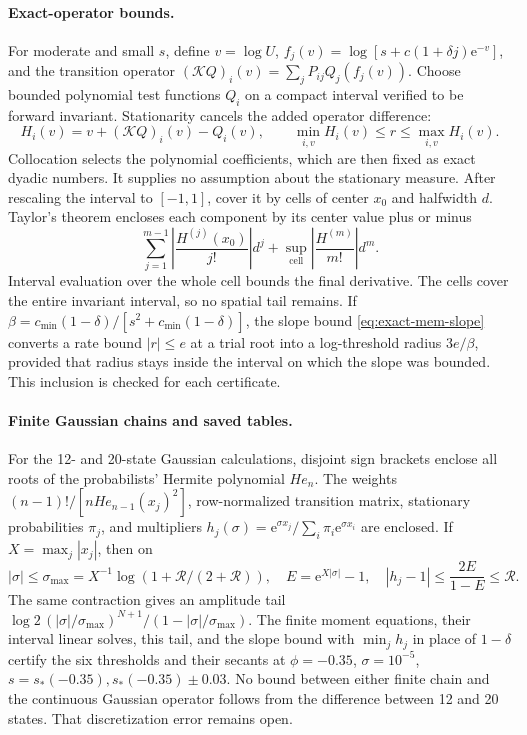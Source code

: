 \paragraph{Exact-operator bounds.}
For moderate and small \(s\), define \(v=\log U\),
\(f_j(v)=\log[s+c(1+\delta j)\mathrm e^{-v}]\), and the transition operator
\((\mathcal K Q)_i(v)=\sum_jP_{ij}Q_j(f_j(v))\).
Choose bounded polynomial test functions \(Q_i\) on a compact interval verified to be forward invariant. Stationarity cancels the added operator difference:
\begin{equation}\label{eq:exact-cert-residual}
 H_i(v)=v+(\mathcal K Q)_i(v)-Q_i(v),\qquad
 \min_{i,v}H_i(v)\leq r\leq\max_{i,v}H_i(v).
\end{equation}
Collocation selects the polynomial coefficients, which are then fixed as exact dyadic numbers. It supplies no assumption about the stationary measure. After rescaling the interval to \([-1,1]\), cover it by cells of center \(x_0\) and halfwidth \(d\). Taylor's theorem encloses each component by its center value plus or minus
\begin{equation}\label{eq:exact-cert-cell}
 \sum_{j=1}^{m-1}\left|\frac{H^{(j)}(x_0)}{j!}\right|d^j
 +\sup_{\mathrm{cell}}\left|\frac{H^{(m)}}{m!}\right|d^m.
\end{equation}
Interval evaluation over the whole cell bounds the final derivative. The cells cover the entire invariant interval, so no spatial tail remains. If \(\beta=c_{\min}(1-\delta)/[s^2+c_{\min}(1-\delta)]\), the slope bound \eqref{eq:exact-mem-slope} converts a rate bound \(|r|\leq e\) at a trial root into a log-threshold radius \(3e/\beta\), provided that radius stays inside the interval on which the slope was bounded. This inclusion is checked for each certificate.

\paragraph{Finite Gaussian chains and saved tables.}
For the 12- and 20-state Gaussian calculations, disjoint sign brackets enclose all roots of the probabilists' Hermite polynomial \(He_n\). The weights \((n-1)!/[nHe_{n-1}(x_j)^2]\), row-normalized transition matrix, stationary probabilities \(\pi_j\), and multipliers \(h_j(\sigma)=\mathrm e^{\sigma x_j}/\sum_i\pi_i\mathrm e^{\sigma x_i}\) are enclosed. If \(X=\max_j|x_j|\), then on
\begin{equation}\label{eq:exact-cert-gaussian}
 |\sigma|\leq\sigma_{\max}=X^{-1}\log(1+\mathcal R/(2+\mathcal R)),
 \quad E=\mathrm e^{X|\sigma|}-1,\quad
 |h_j-1|\leq\frac{2E}{1-E}\leq\mathcal R.
\end{equation}
The same contraction gives an amplitude tail
\(\log2\,(|\sigma|/\sigma_{\max})^{N+1}/(1-|\sigma|/\sigma_{\max})\).
The finite moment equations, their interval linear solves, this tail, and the slope bound with \(\min_jh_j\) in place of \(1-\delta\) certify the six thresholds and their secants at \(\phi=-0.35\), \(\sigma=10^{-5}\), \(s=s_*(-0.35),s_*(-0.35)\pm0.03\).
No bound between either finite chain and the continuous Gaussian operator follows from the difference between 12 and 20 states. That discretization error remains open.

